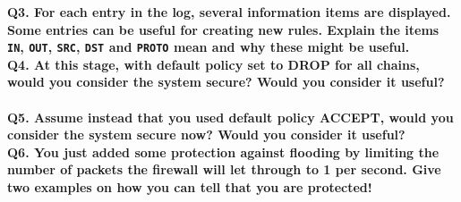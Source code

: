 \noindent \textbf{Q3. For each entry in the log, several information items are
displayed. Some entries can be useful for creating new rules. Explain the 
items \texttt{IN}, \texttt{OUT}, \texttt{SRC}, \texttt{DST} and \texttt{PROTO}
mean and why these might be useful.}
~\ \\

\noindent \textbf{Q4. At this stage, with default policy set to DROP for all 
chains, would you consider the system secure? Would you consider it useful?}
~\ \\

\noindent \textbf{Q5. Assume instead that you used default policy ACCEPT, 
would you consider the system secure now? Would you consider it useful?}
~\ \\

\noindent \textbf{Q6. You just added some protection against flooding by 
limiting the number of packets the firewall will let through to 1 per second. 
Give two examples on how you can tell that you are protected!}
~\ \\
